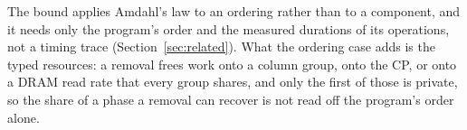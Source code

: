 The bound applies Amdahl's law to an ordering rather than to a component, and it needs only the program's order and the measured durations of its operations, not a timing trace (Section~\ref{sec:related}).
What the ordering case adds is the typed resources: a removal frees work onto a column group, onto the CP, or onto a DRAM read rate that every group shares, and only the first of those is private, so the share of a phase a removal can recover is not read off the program's order alone.

